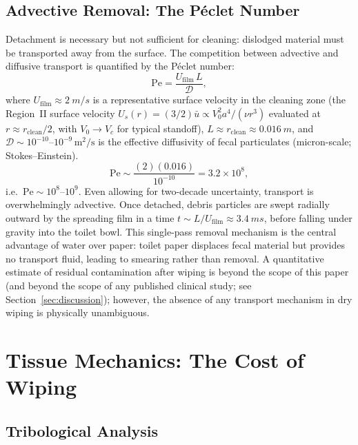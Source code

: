 \documentclass[10pt,letterpaper]{article}
\newcommand{\Pe}{\mathrm{Pe}}
\begin{document}
\subsection{Advective Removal: The P\'{e}clet Number}
\label{subsec:peclet}

Detachment is necessary but not sufficient for cleaning: dislodged material
must be transported away from the surface. The competition between advective
and diffusive transport is quantified by the P\'{e}clet number:
\begin{equation}
    \Pe = \frac{U_\mathrm{film}\,L}{\mathcal{D}},
    \label{eq:peclet}
\end{equation}
where $U_\mathrm{film} \approx 2~m/s$ is a representative surface
velocity in the cleaning zone (the Region~II surface velocity
$U_s(r) = (3/2)\bar u \propto V_0^2 a^4/(\nu r^3)$ evaluated at
$r \approx r_\mathrm{clean}/2$, with $V_0 \to V_c$ for typical standoff),
$L \approx r_\mathrm{clean} \approx 0.016~m$,
and $\mathcal{D} \sim 10^{-10}$--$10^{-9}\,\mathrm{m^2/s}$ is the effective
diffusivity of fecal particulates (micron-scale; Stokes--Einstein).
\begin{equation}
    \Pe \sim \frac{(2)(0.016)}{10^{-10}} = 3.2 \times 10^8,
    \label{eq:peval}
\end{equation}
i.e.\ $\Pe \sim 10^{8}$--$10^9$. Even allowing for two-decade
uncertainty, transport is overwhelmingly advective. Once detached, debris particles are
swept radially outward by the spreading film in a time $t \sim L/U_\mathrm{film}
\approx 3.4~ms$, before falling under gravity into the toilet bowl.
This single-pass removal mechanism is the central advantage of water over
paper: toilet paper displaces fecal material but provides no transport fluid,
leading to smearing rather than removal. A quantitative estimate of residual
contamination after wiping is beyond the scope of this paper (and beyond
the scope of any published clinical study; see Section~\ref{sec:discussion});
however, the absence of any transport mechanism in dry wiping is physically
unambiguous.

\section{Tissue Mechanics: The Cost of Wiping}
\label{sec:tribology}

\subsection{Tribological Analysis}
\label{subsec:tribology}
\end{document}
